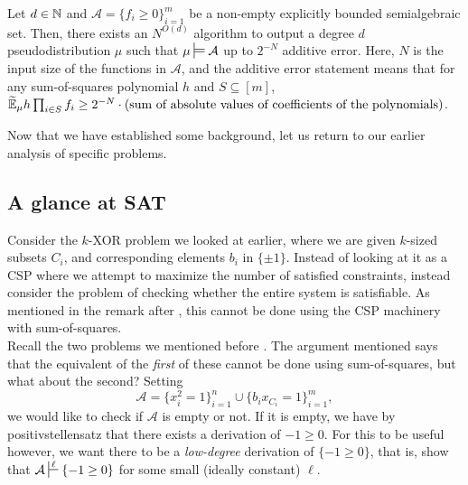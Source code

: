 \begin{fcor}
	Let $d \in \mathbb{N}$ and $\mathcal{A} = \{f_i \ge 0\}_{i=1}^m$ be a non-empty explicitly bounded semialgebraic set. Then, there exists an $N^{O(d)}$ algorithm to output a degree $d$ pseudodistribution $\mu$ such that $\mu \sdtstile{}{} \mathcal{A}$ up to $2^{-N}$ additive error. Here, $N$ is the input size of the functions in $\mathcal{A}$, and the additive error statement means that for any sum-of-squares polynomial $h$ and $S \subseteq [m]$, $\widetilde{\mathbb{E}}_\mu h \prod_{i \in S} f_i \ge 2^{-N} \cdot (\text{sum of absolute values of coefficients of the polynomials})$.
\end{fcor}

Now that we have established some background, let us return to our earlier analysis of specific problems.

\subsection{A glance at \textsf{SAT}}

Consider the $k$-\textsf{XOR} problem we looked at earlier, where we are given $k$-sized subsets $C_i$, and corresponding elements $b_i$ in $\{\pm 1\}$. Instead of looking at it as a CSP where we attempt to maximize the number of satisfied constraints, instead consider the problem of checking whether the entire system is satisfiable. As mentioned in the remark after , this cannot be done using the CSP machinery with sum-of-squares.\\
Recall the two problems we mentioned before . The argument mentioned says that the equivalent of the \emph{first} of these cannot be done using sum-of-squares, but what about the second? Setting
\[ \mathcal{A} = \{x_i^2 = 1\}_{i=1}^n \cup \{b_i x_{C_i} = 1\}_{i=1}^m, \]
we would like to check if $\mathcal{A}$ is empty or not. If it is empty, we have by positivstellensatz that there exists a derivation of $-1 \ge 0$. For this to be useful however, we want there to be a \emph{low-degree} derivation of $\{-1 \ge 0\}$, that is, show that $\mathcal{A} \sststile{}{\ell} \{-1 \ge 0\}$ for some small (ideally constant) $\ell$.\\

